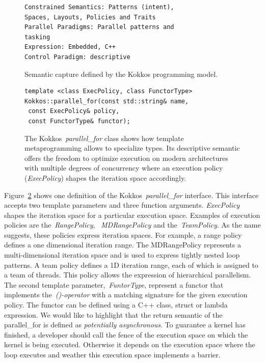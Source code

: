 \begin{figure}[h]
\begin{verbatim}
Constrained Semantics: Patterns (intent),
Spaces, Layouts, Policies and Traits
Parallel Paradigms: Parallel patterns and 
tasking
Expression: Embedded, C++
Control Paradigm: descriptive
\end{verbatim}
\caption{Semantic capture defined by the Kokkos programming model.}
\label{fig:SemCaptureKokkos}
\end{figure}

\begin{figure}
\begin{verbatim}
template <class ExecPolicy, class FunctorType>
Kokkos::parallel_for(const std::string& name, 
 const ExecPolicy& policy, 
 const FunctorType& functor);
\end{verbatim}
\caption{The Kokkos~\emph{parallel\_for} class shows how template metaprogramming allows to specialize types. Its descriptive semantic offers the freedom to optimize execution on modern architectures with multiple degrees of concurrency where an execution policy (\emph{ExecPolicy}) shapes the iteration space accordingly.}
\label{fig:parallelFor}
\end{figure}

Figure~\ref{fig:parallelFor} shows one definition of the Kokkos~\emph{parallel\_for} interface. This interface accepts two template parameters and three function arguments. \emph{ExecPolicy} shapes the iteration space for a particular execution space. Examples of execution policies are the~\emph{RangePolicy}, ~\emph{MDRangePolicy} and the~\emph{TeamPolicy}. As the name suggests, these policies express iteration spaces. For example, a range policy defines a one dimensional iteration range. The MDRangePolicy represents a multi-dimensional iteration space and is used to express tightly nested loop patterns. A team policy defines a 1D iteration range, each of which is assigned to a team of threads. This policy allows the expression of hierarchical parallelism. The second template parameter,~\emph{FuntorType}, represent a functor that implements the~\emph{()-operator} with a matching signature for the given execution policy. The functor can be defined using a C++ class, struct or lambda expression. We would like to highlight that the return semantic of the parallel\_for is defined as \emph{potentially asynchronous}. To guarantee a kernel has finished, a developer should call the fence of the execution space on which the kernel is being executed. Otherwise it depends on the execution space where the loop executes and weather this execution space implements a barrier. 

